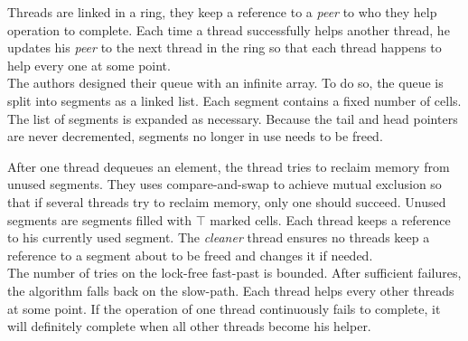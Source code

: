 Threads are linked in a ring, they keep a reference to a \textit{peer} to who
they help operation to complete. Each time a thread successfully helps another
thread, he updates his \textit{peer} to the next thread in the ring so that each
thread happens to help every one at some point. \\

 The authors designed their queue with an infinite
array. To do so, the queue is split into segments as a linked list. Each segment
contains a fixed number of cells. The list of segments is expanded as necessary.
Because the tail and head pointers are never decremented, segments no longer in
use needs to be freed.

After one thread dequeues an element, the thread tries to reclaim memory from
unused segments. They uses compare-and-swap to achieve mutual exclusion so that
if several threads try to reclaim memory, only one should succeed. Unused
segments are segments filled with $\top$ marked cells. Each thread keeps a
reference to his currently used segment. The \textit{cleaner} thread ensures no
threads keep a reference to a segment about to be freed and changes it if
needed. \\

 The number of tries on the lock-free fast-past is
bounded. After sufficient failures, the algorithm falls back on the slow-path.
Each thread helps every other threads at some point. If the operation of one
thread continuously fails to complete, it will definitely complete when all
other threads become his helper.
